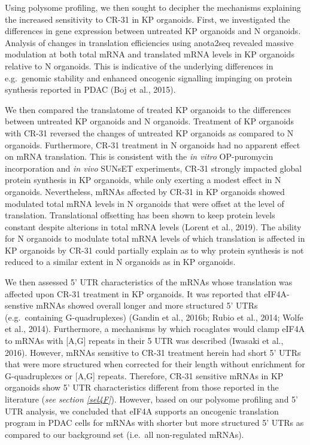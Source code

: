 \documentclass[12pt,openany]{book}
\begin{document}
Using polysome profiling, we then sought to decipher the mechanisms
explaining the increased sensitivity to CR-31 in KP organoids. First, we
investigated the differences in gene expression between untreated KP
organoids and N organoids. Analysis of changes in translation
efficiencies using anota2seq revealed massive modulation at both total
mRNA and translated mRNA levels in KP organoids relative to N organoids.
This is indicative of the underlying differences in e.g.~genomic
stability and enhanced oncogenic signalling impinging on protein
synthesis reported in PDAC (Boj et al., 2015).

We then compared the translatome of treated KP organoids to the
differences between untreated KP organoids and N organoids. Treatment of
KP organoids with CR-31 reversed the changes of untreated KP organoids
as compared to N organoids. Furthermore, CR-31 treatment in N organoids
had no apparent effect on mRNA translation. This is consistent with the
\emph{in vitro} OP-puromycin incorporation and \emph{in vivo} SUNsET
experiments, CR-31 strongly impacted global protein synthesis in KP
organoids, while only exerting a modest effect in N organoids.
Nevertheless, mRNAs affected by CR-31 in KP organoids showed modulated
total mRNA levels in N organoids that were offset at the level of
translation. Translational offsetting has been shown to keep protein
levels constant despite alterions in total mRNA levels (Lorent et al.,
2019). The ability for N organoids to modulate total mRNA levels of
which translation is affected in KP organoids by CR-31 could partially
explain as to why protein synthesis is not reduced to a similar extent
in N organoids as in KP organoids.

We then assessed 5' UTR characteristics of the mRNAs whose translation
was affected upon CR-31 treatment in KP organoids. It was reported that
eIF4A-senstive mRNAs showed overall longer and more structured 5' UTRs
(e.g.~containing G-quadruplexes) (Gandin et al., 2016b; Rubio et al.,
2014; Wolfe et al., 2014). Furthermore, a mechanisms by which rocaglates
would clamp eIF4A to mRNAs with {[}A,G{]} repeats in their 5 UTR was
described (Iwasaki et al., 2016). However, mRNAs sensitive to CR-31
treatment herein had short 5' UTRs that were more structured when
corrected for their length without enrichment for G-quadruplexes or
{[}A,G{]} repeats. Therefore, CR-31 sensitive mRNAs in KP organoids show
5' UTR characteristics different from those reported in the literature
(\emph{see section \ref{sel4F}}). However, based on our polysome
profiling and 5' UTR analysis, we concluded that eIF4A supports an
oncogenic translation program in PDAC cells for mRNAs with shorter but
more structured 5' UTRs as compared to our background set (i.e.~all
non-regulated mRNAs).
\end{document}
